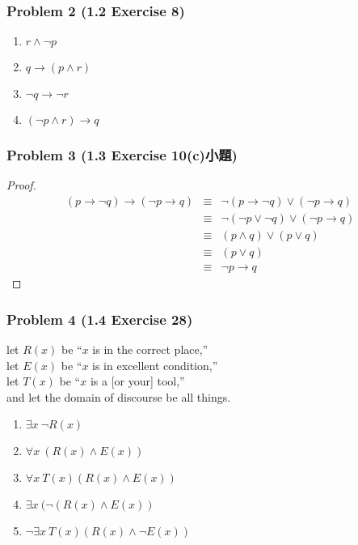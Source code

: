 \documentclass[14pt,hyperref={bookmarks=false}]{beamer}
\begin{document}
	\begin{frame}
	\frametitle{Problem 2 (1.2 Exercise 8)}
	\fontsize{10}{10pt}\selectfont
	\begin{enumerate}[label=(\alph*)]
	\item $r \land \neg p$
	\item $q \rightarrow (p \land r)$ %
	\item $\neg q \rightarrow \neg r$
	\item $(\neg p \land r) \rightarrow q$
	\end{enumerate}
	\end{frame}

	\begin{frame}
	\frametitle{Problem 3 (1.3 Exercise 10(c)小題)}
	\fontsize{10}{10pt}\selectfont
	\begin{proof}
	\begin{eqnarray*}
	  (p \rightarrow \neg q) \rightarrow (\neg p \rightarrow q) & \equiv & \neg (p \rightarrow \neg q) \lor (\neg p \rightarrow q ) \\
	  & \equiv & \neg (\neg p \lor \neg q) \lor (\neg p \rightarrow q  ) \\ %
	  & \equiv & (p \land q) \lor( p \lor q ) \\
	  & \equiv & (p \lor q ) \\
	  & \equiv & \neg p \rightarrow q
	\end{eqnarray*}
	\end{proof}
	\end{frame}
	
	\begin{frame}
	\frametitle{Problem 4 (1.4 Exercise 28)}
	\fontsize{10}{10pt}\selectfont
	let $R(x)$ be “$x$ is in the correct place,”\\
    let $E(x)$ be “$x$ is in excellent condition,”\\
    let $T(x)$ be “$x$ is a [or your] tool,”\\ and let the domain of discourse be all things.
	\begin{enumerate}[label=(\alph*)]
	\item $\exists x ~ \neg R(x)$
	\item $\forall x ~ (R(x) \land E(x)) $ %
	\item $\forall x ~ T(x)(R(x) \land E(x)) $
	\item $\exists x ~( \neg(R(x) \land E(x)) $
	\item $\neg \exists x ~ T(x)(R(x)\land \neg E(x)) $
	\end{enumerate}
	\end{frame}
\end{document}
